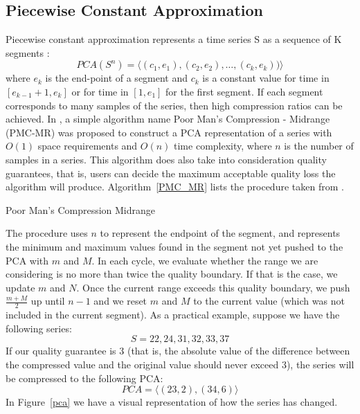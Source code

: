 \subsection{Piecewise Constant Approximation}
Piecewise constant approximation represents a time series S as a sequence of K segments
\cite{Keogh2001Locally}\cite{Lazaridis2003Capturing}:
$$PCA(S^n) = \langle(c_1, e_1), (c_2, e_2), \ldots, (c_k, e_k))\rangle$$
where $e_k$  is the end-point of a segment and $c_k$ is a constant value for time in
$[e_{k-1} + 1, e_k]$ or for time in $[1, e_1]$ for the first segment. If each segment
corresponds to many samples of the series, then high compression ratios can be achieved.
In \cite{Lazaridis2003Capturing}, a simple algorithm name Poor Man’s Compression -
Midrange (PMC-MR) was proposed to construct a PCA  representation of a series with
$O(1)$ space requirements and $O(n)$ time complexity, where $n$ is the number of samples
in a series. This algorithm does also take into consideration quality guarantees, that
is, users can decide the maximum acceptable quality loss the algorithm will produce.
Algorithm~\ref{PMC_MR} lists the procedure taken from \cite{Lazaridis2003Capturing}.

\begin{algorithm}
\caption{Poor Man's Compression Midrange \cite{Lazaridis2003Capturing}}\label{PMC_MR}
\begin{algorithmic}[1]
    \Else
    \EndIf
\EndWhile
{}
\EndProcedure
\end{algorithmic}
\end{algorithm}

The procedure uses $n$ to represent the endpoint of the segment, and represents the
minimum and maximum values found in the segment not yet pushed to the PCA with $m$ and
$M$. In each cycle, we evaluate whether the range we are considering is no more than
twice the quality boundary. If that is the case, we update $m$ and $N$. Once the current
range exceeds this quality boundary, we push $\frac{m + M}{2}$  up until $n - 1$ and we
reset $m$ and $M$ to the current value (which was not included in the current segment).
As a practical example, suppose we have the following series:
$$S = 22, 24, 31, 32, 33, 37$$
If our quality guarantee is 3 (that is, the absolute value of the difference between the
compressed value and the original value should never exceed 3), the series will be
compressed to the following PCA:
$$PCA = \langle(23, 2), (34, 6) \rangle$$
In Figure~\ref{pca} we have a visual representation of how the series has changed.

